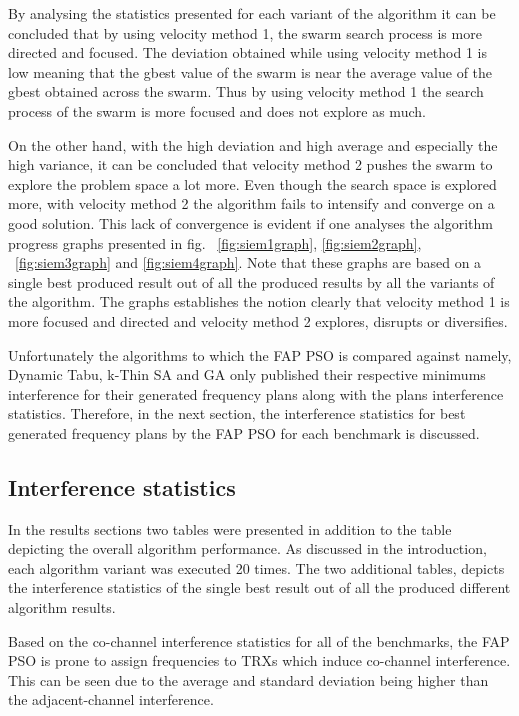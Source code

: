 By analysing the statistics presented for each variant of the algorithm it can be concluded that by using velocity method 1, the swarm search process is more directed and focused. The deviation obtained while using velocity method 1 is low meaning that the gbest value of the swarm is near the average value of the gbest obtained across the swarm. Thus by using velocity method 1 the search process of the swarm is more focused and does not explore as much.

On the other hand, with the high deviation and high average and especially the high variance, it can be concluded that velocity method 2 pushes the swarm to explore the problem space a lot more. Even though the search space is explored more, with velocity method 2 the algorithm fails to intensify and converge on a good solution. This lack of convergence is evident if one analyses the algorithm progress graphs presented in fig. ~\ref{fig:siem1graph}, \ref{fig:siem2graph}, ~\ref{fig:siem3graph} and \ref{fig:siem4graph}. Note that these graphs are based on a single best produced result out of all the produced results by all the variants of the algorithm. The graphs establishes the notion clearly that velocity method 1 is more focused and directed and velocity method 2 explores, disrupts or diversifies.

Unfortunately the algorithms to which the FAP PSO is compared against namely, Dynamic Tabu, k-Thin SA and GA only published their respective minimums interference for their generated frequency plans along with the plans interference statistics. Therefore, in the next section, the interference statistics for best generated frequency plans by the FAP PSO for each benchmark is discussed.

\subsection{Interference statistics}
In the results sections two tables were presented in addition to the table depicting the overall algorithm performance. As discussed in the introduction, each algorithm variant was executed 20 times. The two additional tables, depicts the interference statistics of the single best result out of all the produced different algorithm results.

Based on the co-channel interference statistics for all of the benchmarks, the FAP PSO is prone to assign frequencies to TRXs which induce co-channel interference. This can be seen due to the average and standard deviation being higher than the adjacent-channel interference.

